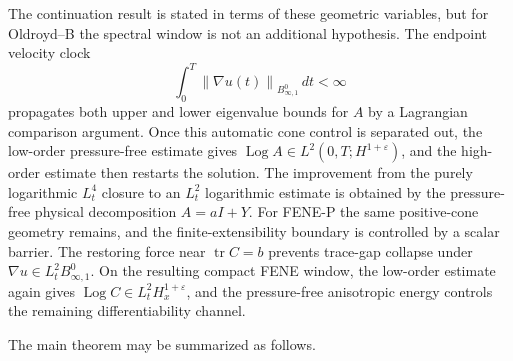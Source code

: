\documentclass[11pt]{article}
\newcommand{\tr}{\operatorname{tr}}
\newcommand{\Log}{\operatorname{Log}}
\newcommand{\eps}{\varepsilon}
\newcommand{\norm}[1]{\left\lVert #1\right\rVert}
\newcommand{\Besov}{B^0_{\infty,1}}
\begin{document}
The continuation result is stated in terms of these geometric variables, but
for Oldroyd--B the spectral window is not an additional hypothesis.  The
endpoint velocity clock
\[
  \int_0^T\norm{\nabla u(t)}_{\Besov}\,dt<\infty
\]
propagates both upper and lower eigenvalue bounds for \(A\) by a Lagrangian
comparison argument.  Once this automatic cone control is separated out,
the low-order pressure-free estimate gives
\(\Log A\in L^2(0,T;H^{1+\varepsilon})\), and the high-order estimate then
restarts the solution.  The improvement from the purely logarithmic
\(L^4_t\) closure to an \(L^2_t\) logarithmic estimate is obtained by the
pressure-free physical decomposition \(A=aI+Y\).
For FENE-P the same positive-cone geometry remains, and the finite-extensibility boundary is controlled by a scalar barrier.  The restoring force
near \(\tr C=b\) prevents trace-gap collapse under
\(\nabla u\in L^2_tB^0_{\infty,1}\).  On the resulting compact FENE window,
the low-order estimate again gives
\(\Log C\in L^2_tH^{1+\eps}_x\), and the pressure-free anisotropic energy
controls the remaining differentiability channel.

The main theorem may be summarized as follows.
\end{document}
